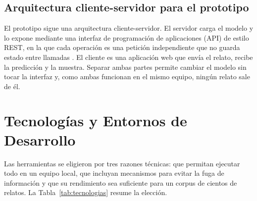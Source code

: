 \subsection{Arquitectura cliente-servidor para el prototipo}
El prototipo sigue una arquitectura cliente-servidor. El servidor carga el modelo y lo expone mediante una interfaz de programación de aplicaciones (API) de estilo REST, en la que cada operación es una petición independiente que no guarda estado entre llamadas \citep{fielding2000}. El cliente es una aplicación web que envía el relato, recibe la predicción y la muestra. Separar ambas partes permite cambiar el modelo sin tocar la interfaz y, como ambas funcionan en el mismo equipo, ningún relato sale de él.

\section{Tecnologías y Entornos de Desarrollo}
Las herramientas se eligieron por tres razones técnicas: que permitan ejecutar todo en un equipo local, que incluyan mecanismos para evitar la fuga de información y que su rendimiento sea suficiente para un corpus de cientos de relatos. La Tabla~\ref{tab:tecnologias} resume la elección.

